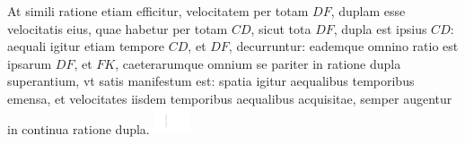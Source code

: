 At simili ratione etiam efficitur, velocitatem per totam $DF$, duplam esse velocitatis eius, quae habetur per totam $CD$, sicut tota $DF$, dupla est ipsius $CD$: aequali igitur etiam tempore $CD$, et $DF$, decurruntur: eademque omnino ratio est ipsarum $DF$, et $FK$, caeterarumque omnium se pariter in ratione dupla superantium, vt satis manifestum est: spatia igitur aequalibus temporibus emensa, et velocitates iisdem temporibus aequalibus acquisitae, semper augentur in continua ratione dupla. 
\pend
\vspace{1.0em}%
\pstart%
\centering%
\noindent%
\includegraphics[width=0.08\textwidth]{images/cazreus1645-d3.pdf}%
\pend
\pstart%
\centering%
\pend
